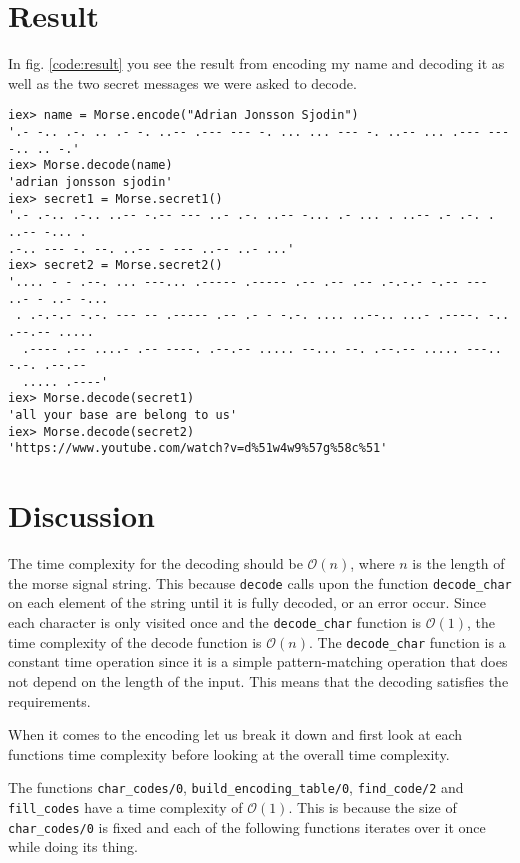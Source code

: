 \documentclass[a4paper,11pt]{article}
\newenvironment{code}{\captionsetup{type=listing}}{}
\begin{document}
\section*{Result}
In fig. \ref{code:result} you see the result from encoding my name and decoding it as well as the two secret messages we were asked to decode.

\begin{code}
\label{code:result}
\begin{verbatim}
iex> name = Morse.encode("Adrian Jonsson Sjodin")
'.- -.. .-. .. .- -. ..-- .--- --- -. ... ... --- -. ..-- ... .--- --- -.. .. -.'
iex> Morse.decode(name)                          
'adrian jonsson sjodin'
iex> secret1 = Morse.secret1()
'.- .-.. .-.. ..-- -.-- --- ..- .-. ..-- -... .- ... . ..-- .- .-. . ..-- -... . 
.-.. --- -. --. ..-- - --- ..-- ..- ...'
iex> secret2 = Morse.secret2()
'.... - - .--. ... ---... .----- .----- .-- .-- .-- .-.-.- -.-- --- ..- - ..- -...
 . .-.-.- -.-. --- -- .----- .-- .- - -.-. .... ..--.. ...- .----. -.. .--.-- .....
  .---- .-- ....- .-- ----. .--.-- ..... --... --. .--.-- ..... ---.. -.-. .--.-- 
  ..... .----'
iex> Morse.decode(secret1)    
'all your base are belong to us'
iex> Morse.decode(secret2)
'https://www.youtube.com/watch?v=d%51w4w9%57g%58c%51'
\end{verbatim}
\end{code}
\section*{Discussion}
The time complexity for the decoding should be $\mathcal{O}(n)$, where $n$ is the length of the morse signal string. This because {\tt decode} calls upon 
the function {\tt decode\_char} on each element of the string until it is fully decoded, or an error occur. Since each character is only
visited once and the {\tt decode\_char} function is $\mathcal{O}(1)$, the time complexity of the decode function is $\mathcal{O}(n)$.
The {\tt decode\_char} function is a constant time operation since it is a simple pattern-matching operation that does
not depend on the length of the input. This means that the decoding satisfies the requirements. 

When it comes to the encoding let us break it down and first look at each functions time complexity before looking at the overall time complexity.

The functions {\tt char\_codes/0}, {\tt build\_encoding\_table/0}, {\tt find\_code/2} and {\tt fill\_codes} have a time complexity of 
$\mathcal{O}(1)$. This is because the size of {\tt char\_codes/0} is fixed and each of the following functions iterates over it once while doing
its thing.
\end{document}

